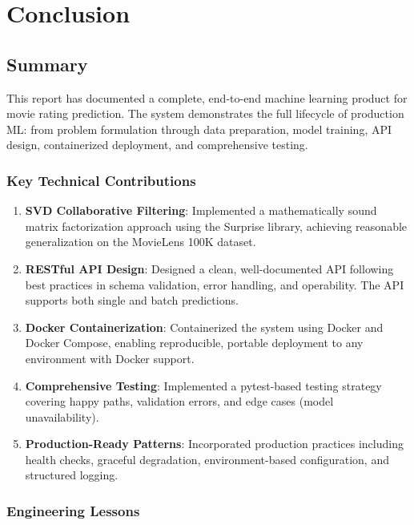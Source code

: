 \section{Conclusion}
\label{sec:conclusion}

\subsection{Summary}

This report has documented a complete, end-to-end machine learning product for movie rating prediction. 
The system demonstrates the full lifecycle of production ML: from problem formulation through data preparation, 
model training, API design, containerized deployment, and comprehensive testing.

\subsubsection{Key Technical Contributions}

\begin{enumerate}
  \item \textbf{SVD Collaborative Filtering}: Implemented a mathematically sound matrix factorization approach 
  using the Surprise library, achieving reasonable generalization on the MovieLens 100K dataset.
  
  \item \textbf{RESTful API Design}: Designed a clean, well-documented API following best practices in schema 
  validation, error handling, and operability. The API supports both single and batch predictions.
  
  \item \textbf{Docker Containerization}: Containerized the system using Docker and Docker Compose, enabling 
  reproducible, portable deployment to any environment with Docker support.
  
  \item \textbf{Comprehensive Testing}: Implemented a pytest-based testing strategy covering happy paths, 
  validation errors, and edge cases (model unavailability).
  
  \item \textbf{Production-Ready Patterns}: Incorporated production practices including health checks, graceful 
  degradation, environment-based configuration, and structured logging.
\end{enumerate}

\subsubsection{Engineering Lessons}

